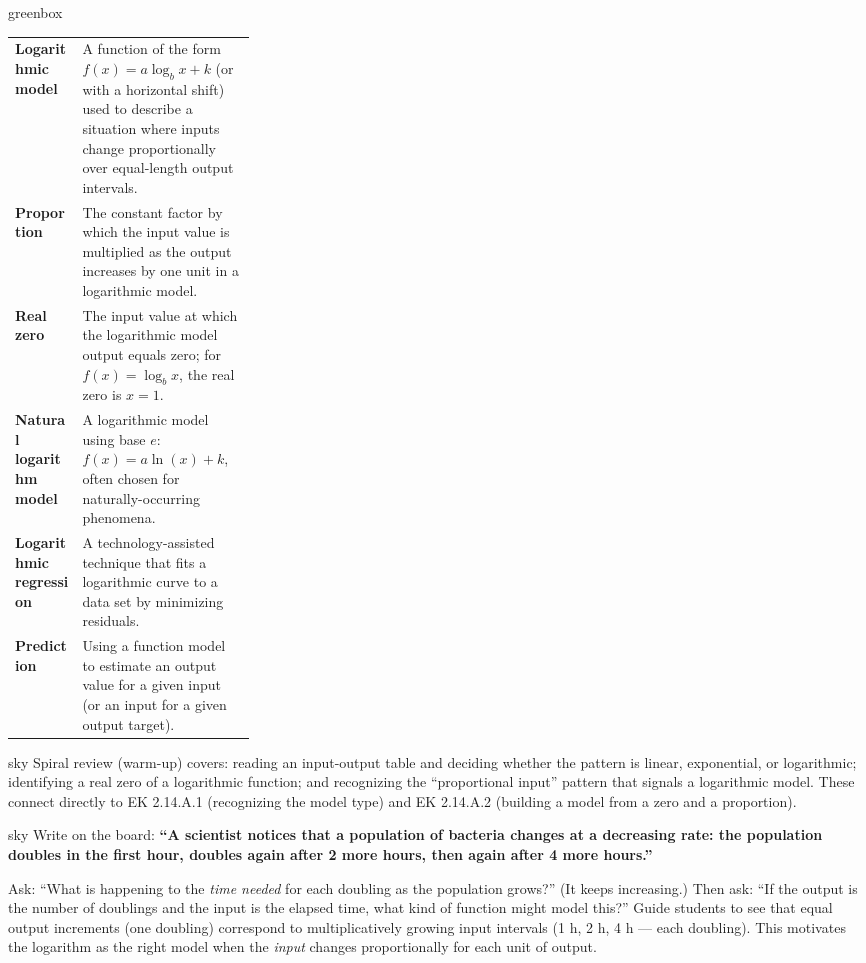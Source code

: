 \documentclass[10pt]{article}
\begin{document}
\begin{skillbox}{greenbox}
\renewcommand{\arraystretch}{1.4}
\begin{tabularx}{\linewidth}{@{} >{\leavevmode\bfseries\color{navy}}p{0.28\linewidth} X @{}}
Logarithmic model & A function of the form $f(x) = a\log_b x + k$ (or with a horizontal
                    shift) used to describe a situation where inputs change proportionally over
                    equal-length output intervals. \\
Proportion        & The constant factor by which the input value is multiplied as the output
                    increases by one unit in a logarithmic model. \\
Real zero         & The input value at which the logarithmic model output equals zero;
                    for $f(x) = \log_b x$, the real zero is $x = 1$. \\
Natural logarithm model & A logarithmic model using base $e$: $f(x) = a\ln(x) + k$, often
                    chosen for naturally-occurring phenomena. \\
Logarithmic regression & A technology-assisted technique that fits a logarithmic curve to a
                    data set by minimizing residuals. \\
Prediction        & Using a function model to estimate an output value for a given input
                    (or an input for a given output target). \\
\end{tabularx}
\end{skillbox}

\begin{skillbox}{sky}
    Spiral review (warm-up) covers: reading an input-output table and deciding whether
    the pattern is linear, exponential, or logarithmic; identifying a real zero of a
    logarithmic function; and recognizing the ``proportional input'' pattern that signals
    a logarithmic model. These connect directly to EK 2.14.A.1 (recognizing the model type)
    and EK 2.14.A.2 (building a model from a zero and a proportion).
\end{skillbox}

\begin{skillbox}[Hook]{sky}
    Write on the board: \textbf{``A scientist notices that a population of bacteria changes at
    a decreasing rate: the population doubles in the first hour, doubles again after 2 more
    hours, then again after 4 more hours.''}

    Ask: ``What is happening to the \emph{time needed} for each doubling as the population
    grows?'' (It keeps increasing.) Then ask: ``If the output is the number of doublings and
    the input is the elapsed time, what kind of function might model this?'' Guide students
    to see that equal output increments (one doubling) correspond to multiplicatively growing
    input intervals (1 h, 2 h, 4 h --- each doubling). This motivates the logarithm as the
    right model when the \emph{input} changes proportionally for each unit of output.
\end{skillbox}
\end{document}
